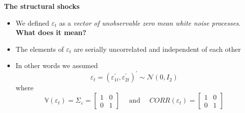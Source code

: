 \documentclass[10pt,english,t,aspectratio=169,ignorenonframetext]{beamer}
\begin{document}
\begin{frame}
{\textbf{The structural shocks}}\bigskip

\begin{itemize}
\item We defined $\varepsilon _{t}$ as a \emph{vector of unobservable zero
mean white noise processes}. \textbf{What does it mean?} \bigskip \medskip%
\pause

\item The elements of $\varepsilon _{t}$ are serially uncorrelated and
independent of each other\bigskip \medskip\medskip

\item In other words we assumed 
\begin{equation*}
\varepsilon _{t}=(\varepsilon _{1t}^{\prime },\varepsilon _{2t}^{\prime
})^{\prime }\sim \mathcal{N}(0,I_{2})
\end{equation*}%
\medskip where\medskip 
\begin{equation*}
\mathbb{V}(\varepsilon _{t})=\Sigma _{\varepsilon }=\left[ 
\begin{array}{cc}
1 & 0 \\ 
0 & 1%
\end{array}%
\right] \ \ \ \ \ \ \text{and}\ \ \ \ \ \ CORR(\varepsilon _{t})=\left[ 
\begin{array}{cc}
1 & 0 \\ 
0 & 1%
\end{array}%
\right]
\end{equation*}
\end{itemize}
\end{frame}

\end{document}

